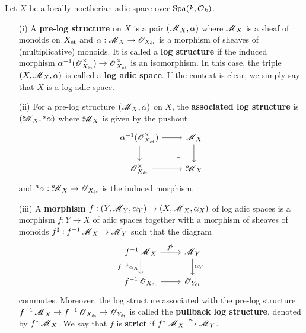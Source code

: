 \begin{Definition}
Let $X$ be a locally noetherian adic space over $\operatorname{Spa}(k, \operatorname{\mathcal{O}}_k)$.
\begin{enumerate}
\item[(i)] A \textbf{pre-log structure} on $X$ is a pair $(\operatorname{\mathscr{M}}_{X}, \alpha)$ where $\operatorname{\mathscr{M}}_{X}$ is a sheaf of monoids on $X_{\operatorname{\textrm{\'{e}t}}}$ and $\alpha:\operatorname{\mathscr{M}}_{X}\rightarrow \operatorname{\mathscr{O}}_{X_{\operatorname{\textrm{\'{e}t}}}}$ is a morphism of sheaves of (multiplicative) monoids. It is called a \textbf{log structure} if the induced morphism $\alpha^{-1}(\operatorname{\mathscr{O}}^{\times}_{X_{\operatorname{\textrm{\'{e}t}}}})\rightarrow \operatorname{\mathscr{O}}^{\times}_{X_{\operatorname{\textrm{\'{e}t}}}}$ is an isomorphism. In this case, the triple $(X, \operatorname{\mathscr{M}}_{X}, \alpha)$ is called a \textbf{log adic space}. If the context is clear, we simply say that $X$ is a log adic space. 
\item[(ii)] For a pre-log structure $(\operatorname{\mathscr{M}}_{X}, \alpha)$ on $X$, the \textbf{associated log structure} is $({}^{a}\!\!\!\!\operatorname{\mathscr{M}}_X, {}^{a}\alpha)$ where ${}^{a}\!\!\!\!\operatorname{\mathscr{M}}_X$ is given by the pushout 
$$
\begin{tikzcd}
\alpha^{-1}(\scrO^{\times}_{X_{\et}})\arrow[r] \arrow[d] & \scrM_X \arrow[d]  \\
       \scrO^{\times}_{X_{\et}}  \arrow[r] & {}^{a}\!\!\!\!\scrM_X \arrow[ul, phantom, "\ulcorner", very near start]
\end{tikzcd}
$$
and ${}^{a}\alpha:{}^{a}\!\!\!\!\operatorname{\mathscr{M}}_{X}\rightarrow \operatorname{\mathscr{O}}_{X_{\operatorname{\textrm{\'{e}t}}}}$ is the induced morphism.
\item[(iii)] A \textbf{morphism} $f: (Y, \operatorname{\mathscr{M}}_Y, \alpha_Y)\rightarrow (X, \operatorname{\mathscr{M}}_X, \alpha_X)$ of log adic spaces is a morphism $f: Y\rightarrow X$ of adic spaces together with a morphism of sheaves of monoids $f^{\sharp}:f^{-1}\operatorname{\mathscr{M}}_X\rightarrow \operatorname{\mathscr{M}}_Y$ such that the diagram
$$
\begin{tikzcd}
{f^{-1}\scrM_X} \arrow[r, "f^{\sharp}"] \arrow[d, "f^{-1}\alpha_X"'] & \scrM_Y \arrow[d, "\alpha_Y"]  \\
        {f^{-1}\scrO_{X_{\et}}} \arrow[r] & {\scrO_{Y_{\et}}} 
\end{tikzcd}
$$
commutes. Moreover, the log structure associated with the pre-log structure $f^{-1}\operatorname{\mathscr{M}}_X\rightarrow f^{-1}\operatorname{\mathscr{O}}_{X_{\operatorname{\textrm{\'{e}t}}}}\rightarrow \operatorname{\mathscr{O}}_{Y_{\operatorname{\textrm{\'{e}t}}}}$ is called the \textbf{pullback log structure}, denoted by $f^*\operatorname{\mathscr{M}}_X$. We say that $f$ is \textbf{strict} if $f^*\operatorname{\mathscr{M}}_X\xrightarrow[]{\sim} \operatorname{\mathscr{M}}_Y$.
\end{enumerate}
\end{Definition}

